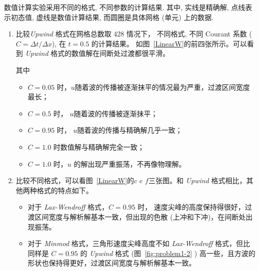 \documentclass[10.5pt
]{article}
\begin{document}
数值计算实验采用不同的格式, 不同参数的计算结果.
其中, 实线是精确解, 点线表示初态值, 虚线是数值计算结果, 而圆圈是具体网格 (单元) 上的数据. 

\begin{enumerate}
    \item 比较\textit{Upwind} 格式在网格总数取 428 情况下，
        不同格式, 不同 Courant 系数 ($C = \Delta t / \Delta x$), 在 $t = 0.5$ 的计算结果。
        如图~\ref{LinearW}的前四张所示。可以看到 \textit{Upwind} 格式的数值解在间断处过渡都很平滑。

        其中
\begin{itemize}
	\item $C = 0.05$ 时，$u$随着波的传播被逐渐抹平的情况最为严重，过渡区间宽度最长；
	\item $C = 0.5$ 时， $u$随着波的传播被逐渐抹平；
	\item $C = 0.95$ 时， $u$随着波的传播与精确解几乎一致；
	\item $C = 1.0$ 时数值解与精确解完全一致；
	\item $C = 1.0$ 时，$u$ 的解出现严重振荡，不再像物理解。
\end{itemize}

\item
    比较不同格式，可以看图~\ref{LinearW}的$c$ $e$ $f$三张图。和 \textit{Upwind} 格式相比，其他两种格式的特点如下。
\begin{itemize}
    \item 对于 \textit{Lax-Wendroff} 格式，$C=0.95$ 时， 速度尖峰的高度保持得很好，过渡区间宽度与解析解基本一致，但出现的色散 (上冲和下冲)，在间断处出现振荡。
    \item 对于 \textit{Minmod} 格式，三角形速度尖峰高度不如 \textit{Lax-Wendroff} 格式，但比同样是 $C = 0.95$ 的 \textit{Upwind} 格式 (图~\ref{fig:problem1-2} ) 高一些，且方波的形状也保持得更好，过渡区间宽度与解析解基本一致。
\end{itemize}
\end{enumerate}
\end{document}
